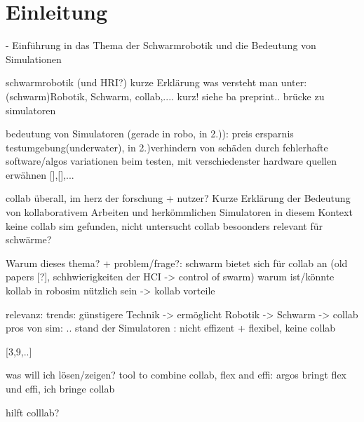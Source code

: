 \documentclass[german,version-2020-11]{uzl-thesis}
\begin{document}
%
%


\chapter{Einleitung}


%




  - Einführung in das Thema der Schwarmrobotik und die Bedeutung von Simulationen
      
      schwarmrobotik (und HRI?)
        kurze Erklärung
          was versteht man unter: (schwarm)Robotik, Schwarm, collab,.... kurz!
          siehe ba preprint..
        brücke zu simulatoren
      
      
      bedeutung von Simulatoren (gerade in robo, in 2.)):
        preis ersparnis  testumgebung(underwater), 
        in 2.)verhindern von schäden durch fehlerhafte software/algos
        variationen beim testen, mit verschiedenster hardware  
        quellen erwähnen [],[],...

    
      collab überall, im herz der forschung + nutzer? 
      Kurze Erklärung der Bedeutung von kollaborativem Arbeiten und herkömmlichen Simulatoren in diesem Kontext
        keine collab sim gefunden, nicht untersucht
      collab besoonders relevant für schwärme?



      \begin{Code}

      Warum dieses thema? + problem/frage?:
      schwarm bietet sich für collab an  (old papers [?], schhwierigkeiten der HCI -> control of swarm)
      warum ist/könnte kollab in robosim nützlich sein -> kollab vorteile

      relevanz:
      trends: günstigere Technik -> ermöglicht Robotik -> Schwarm -> collab
      pros von sim: ..
      stand der Simulatoren : nicht effizent + flexibel, keine collab

      [3,9,..]

      was will ich lösen/zeigen?
      tool to combine collab, flex and effi:
      argos bringt flex und effi,
      ich bringe collab

      hilft colllab?


      \end{Code}
\end{document}
